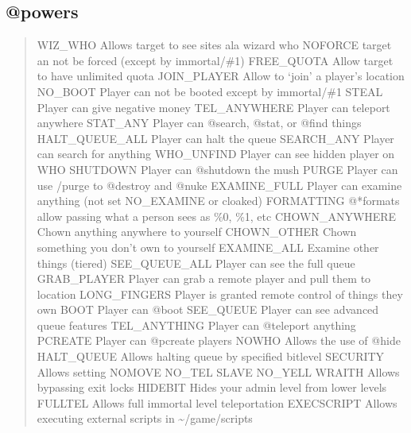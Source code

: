 \documentclass[letterpaper,10pt,english]{sphinxmanual}
\begin{document}
\subsection{@powers}
\label{\detokenize{security:powers}}\begin{quote}

\sphinxAtStartPar
WIZ\_WHO            \sphinxhyphen{} Allows target to see sites ala wizard who
NOFORCE            \sphinxhyphen{} target an not be forced (except by immortal/\#1)
FREE\_QUOTA         \sphinxhyphen{} Allow target to have unlimited quota
JOIN\_PLAYER        \sphinxhyphen{} Allow to ‘join’ a player’s location
NO\_BOOT            \sphinxhyphen{} Player can not be booted except by immortal/\#1
STEAL              \sphinxhyphen{} Player can give negative money
TEL\_ANYWHERE       \sphinxhyphen{} Player can teleport anywhere
STAT\_ANY           \sphinxhyphen{} Player can @search, @stat, or @find things
HALT\_QUEUE\_ALL     \sphinxhyphen{} Player can halt the queue
SEARCH\_ANY         \sphinxhyphen{} Player can search for anything
WHO\_UNFIND         \sphinxhyphen{} Player can see hidden player on WHO
SHUTDOWN           \sphinxhyphen{} Player can @shutdown the mush
PURGE              \sphinxhyphen{} Player can use /purge to @destroy and @nuke
EXAMINE\_FULL       \sphinxhyphen{} Player can examine anything (not set NO\_EXAMINE or cloaked)
FORMATTING         \sphinxhyphen{} @*formats allow passing what a person sees as \%0, \%1, etc
CHOWN\_ANYWHERE     \sphinxhyphen{} Chown anything anywhere to yourself
CHOWN\_OTHER        \sphinxhyphen{} Chown something you don’t own to yourself
EXAMINE\_ALL        \sphinxhyphen{} Examine other things (tiered)
SEE\_QUEUE\_ALL      \sphinxhyphen{} Player can see the full queue
GRAB\_PLAYER        \sphinxhyphen{} Player can grab a remote player and pull them to location
LONG\_FINGERS       \sphinxhyphen{} Player is granted remote control of things they own
BOOT               \sphinxhyphen{} Player can @boot
SEE\_QUEUE          \sphinxhyphen{} Player can see advanced queue features
TEL\_ANYTHING       \sphinxhyphen{} Player can @teleport anything
PCREATE            \sphinxhyphen{} Player can @pcreate players
NOWHO              \sphinxhyphen{} Allows the use of @hide
HALT\_QUEUE         \sphinxhyphen{} Allows halting queue by specified bitlevel
SECURITY           \sphinxhyphen{} Allows setting  NOMOVE    NO\_TEL   SLAVE   NO\_YELL
WRAITH             \sphinxhyphen{} Allows bypassing exit locks
HIDEBIT            \sphinxhyphen{} Hides your admin level from lower levels
FULLTEL            \sphinxhyphen{} Allows full immortal level teleportation
EXECSCRIPT         \sphinxhyphen{} Allows executing external scripts in \textasciitilde{}/game/scripts
\end{quote}
\end{document}
